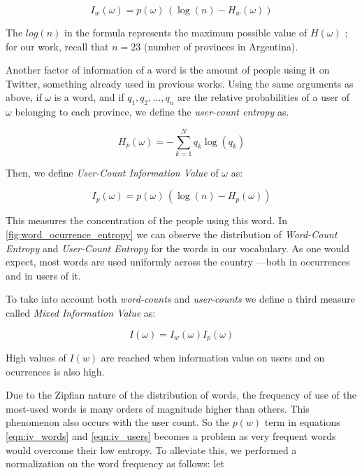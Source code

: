 \begin{equation}
  \label{eqn:iv_words}
  I_w(\omega) = p(\omega) \,  (\log(n) - H_w(\omega))
\end{equation}

The $log(n)$ in the formula represents the maximum possible value of $H(\omega)$ \cite{shannon2001mathematical}; for our work, recall that $n = 23$ (number of provinces in Argentina).

Another factor of information of a word is the amount of people using it on Twitter, something already used in previous works\cite{Cui:2012:DBE:2396761.2398519}. Using the same arguments as above, if $\omega$ is a word, and if $q_1, q_2, \ldots , q_n$ are the relative probabilities of a user of $\omega$ belonging to each province, we define the \emph{user-count entropy} as.

\begin{equation}
    H_p(\omega) = -\sum \limits_{k=1}^{N} q_k \log(q_k)
\end{equation}


Then, we define \emph{User-Count Information Value} of  $\omega$ as:

\begin{equation}
  \label{eqn:iv_users}
  I_p(\omega) = p(\omega) \, (\log(n) - H_p(\omega))
\end{equation}

This measures the concentration of the people using this word.  In \ref{fig:word_ocurrence_entropy} we can observe the distribution of \emph{Word-Count Entropy} and \emph{User-Count Entropy} for the words in our vocabulary. As one would expect, most words are used uniformly across the country —both in occurrences and in users of it.

To take into account both \emph{word-counts} and \emph{user-counts} we define a third measure called \emph{Mixed Information Value} as:

\begin{equation}
  I(\omega) = I_w(\omega)  I_p(\omega)
\end{equation}


High values of $I(w)$ are reached when information value on users and on ocurrences is also high.



Due to the Zipfian nature of the distribution of words, the frequency of use of the most-used words is many orders of magnitude higher than others. This phenomenon also occurs with the user count. So the $p(w)$ term in equations \eqref{eqn:iv_words} and \eqref{eqn:iv_users} becomes a problem as very frequent words would overcome their low entropy. To alleviate this, we performed a normalization on the word frequency as follows: let 

